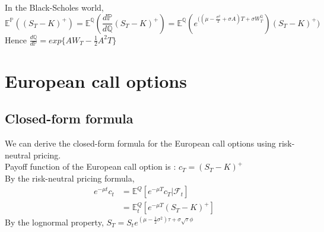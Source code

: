 In the Black-Scholes world,
$$\mathbb{E}^{\mathbb{P}}((S_{T} - K)^{+})= \mathbb{E}^{\mathbb{Q}}(\frac{d\mathbb{P}}{d\mathbb{Q}}(S_{T} - K)^{+}) = \mathbb{E}^{\mathbb{Q}}(e^{((\mu - \frac{\sigma^{2}}{2}+\sigma A)T + \sigma W_{T}^{\mathbb{Q}}})(S_{T} - K)^{+})$$
Hence $\displaystyle \frac{d\mathbb{Q}}{d\mathbb{P}} = exp\{AW_{T} - \frac{1}{2}A^{2}T\}$
\newpage

\section{European call options}
\subsection{Closed-form formula}
We can derive the closed-form formula for the European call options using risk-neutral pricing.\\
Payoff function of the European call option is : $c_{T} = (S_{T} - K)^{+}$\\
By the risk-neutral pricing formula,
\begin{equation}
\begin{split}
e^{-\mu t}c_{t}
&= \mathbb{E}^{Q}[e^{-\mu T}c_{T} | \mathcal{F}_{t}]\\
&= \mathbb{E}_{t}^{Q}[e^{-\mu T}(S_{T} - K)^{+}]
\end{split}
\end{equation}
By the lognormal property, \quad
$S_{T} = S_{t}e^{(\mu - \frac{1}{2}\sigma^{2})\tau + \sigma\sqrt{\tau}\phi}$
